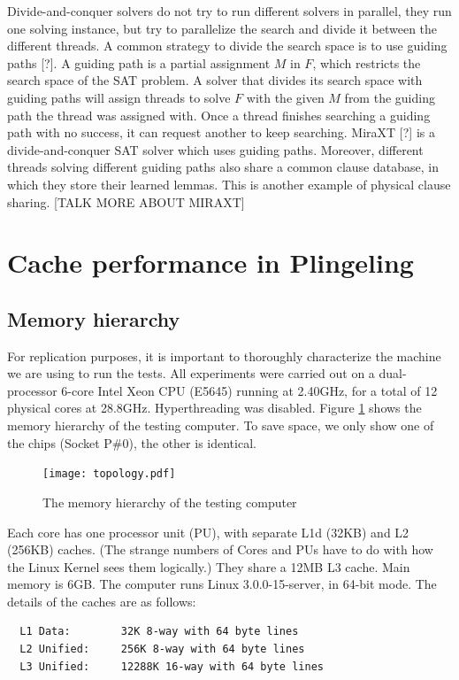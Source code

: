 \documentclass{llncs}
\begin{document}
Divide-and-conquer solvers do not try to run different solvers in parallel, they run one solving instance, but try to parallelize the search and divide it between the different threads. A common strategy to divide the search space is to use guiding paths [?]. A guiding path is a partial assignment $M$ in $F$, which restricts the search space of the SAT problem. A solver that divides its search space with guiding paths will assign threads to solve $F$ with the given $M$ from the guiding path the thread was assigned with. Once a thread finishes searching a guiding path with no success, it can request another to keep searching. MiraXT [?] is a divide-and-conquer SAT solver which uses guiding paths. Moreover, different threads solving different guiding paths also share a common clause database, in which they store their learned lemmas. This is another example of physical clause sharing. [TALK MORE ABOUT MIRAXT]

\section{Cache performance in Plingeling}
\subsection{Memory hierarchy}
\label{sec:memhier}

For replication purposes, it is important to thoroughly characterize
the machine we are using to run the tests. All experiments were
carried out on a dual-processor 6-core Intel Xeon CPU (E5645) running
at 2.40GHz, for a total of 12 physical cores at
28.8GHz. Hyperthreading was disabled. Figure \ref{fig:topology} shows
the memory hierarchy of the testing computer. To save space, we only
show one of the chips (Socket P\#0), the other is identical.

\begin{figure}[htp]
  \centering
  \texttt{[image: topology.pdf]}
  \caption{The memory hierarchy of the testing computer}
  \label{fig:topology}
\end{figure}

Each core has one processor unit (PU), with separate L1d (32KB) and L2
(256KB) caches. (The strange numbers of Cores and PUs have to do with
how the Linux Kernel sees them logically.) They share a 12MB L3
cache. Main memory is 6GB. The computer runs Linux 3.0.0-15-server, in
64-bit mode. The details of the caches are as follows:

\small
\begin{verbatim}
  L1 Data:        32K 8-way with 64 byte lines
  L2 Unified:     256K 8-way with 64 byte lines
  L3 Unified:     12288K 16-way with 64 byte lines
\end{verbatim}
\normalsize
\end{document}
